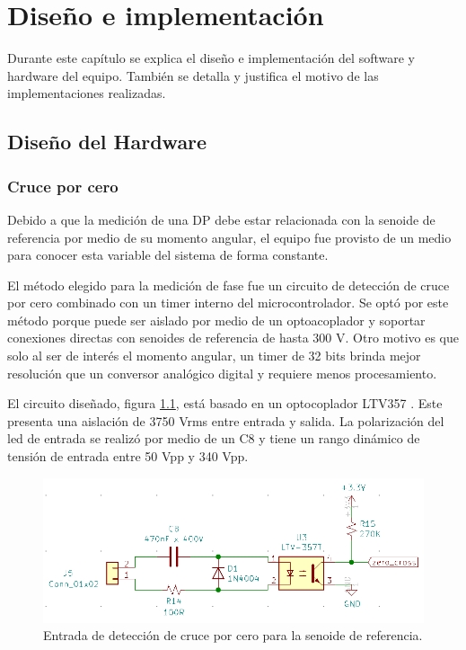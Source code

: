 \chapter{Diseño e implementación} %

\label{Chapter3} %
Durante este capítulo se explica el diseño e implementación del software y hardware del equipo. También se detalla y justifica el motivo de las implementaciones realizadas.

\section{Diseño del Hardware}
\subsection{Cruce por cero}

Debido a que la medición de una DP debe estar relacionada con la senoide de referencia por medio de su momento angular, el equipo fue provisto de un medio para conocer esta variable del sistema de forma constante.

El método elegido para la medición de fase fue un circuito de detección de cruce por cero combinado con un timer interno del microcontrolador. Se optó por este método porque puede ser aislado por medio de un optoacoplador y soportar conexiones directas con senoides de referencia de hasta 300 V. Otro motivo es que solo al ser de interés el momento angular, un timer de 32 bits brinda mejor resolución que un conversor analógico digital y requiere menos procesamiento.

El circuito diseñado, figura \ref{fig:schZeroCross}, está basado en un optocoplador LTV357 \citep{opto:ltv357}. Este presenta una aislación de 3750 Vrms entre entrada y salida. La polarización del led de entrada se realizó por medio de un C8 y tiene un rango dinámico de tensión de entrada entre 50 Vpp y 340 Vpp. 

\begin{figure}[ht]
	\centering
	\includegraphics[width=130mm]{./Figures/schZeroCross.png}
	\caption{Entrada de detección de cruce por cero para la senoide de referencia.}
	\label{fig:schZeroCross}
\end{figure}

